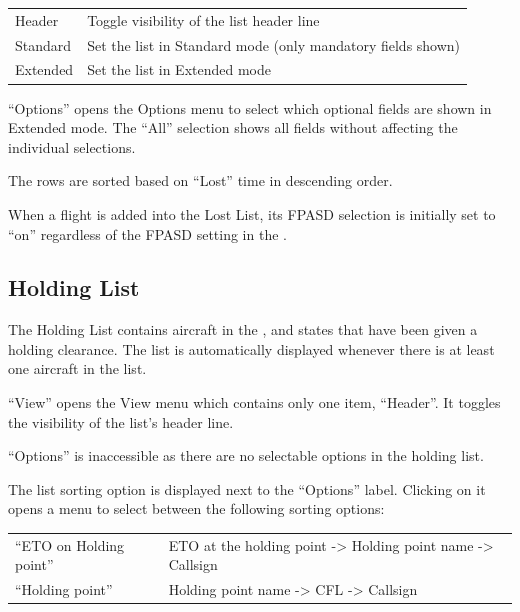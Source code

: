 \documentclass[a4paper,oneside,11pt]{memoir}
\begin{document}
\begin{longtable}{p{5cm} p{7.5cm}}
    Header      & Toggle visibility of the list header line                   \\
    Standard    & Set the list in Standard mode (only mandatory fields shown) \\
    Extended    & Set the list in Extended mode                               \\
\end{longtable}

\bigskip

“Options” opens the Options menu to select which optional fields are shown in Extended mode. The “All” selection shows all fields without affecting the individual selections.

\bigskip

The rows are sorted based on “Lost” time in descending order.

\bigskip

When a flight is added into the Lost List, its FPASD selection is initially set to “on” regardless of the FPASD setting in the .

\subsection{Holding List}
\label{list:hold}

The Holding List contains aircraft in the ,  and  states that have been given a holding clearance. The list is automatically displayed whenever there is at least one aircraft in the list.


“View” opens the View menu which contains only one item, “Header”. It toggles the visibility of the list’s header line.

\bigskip

“Options” is inaccessible as there are no selectable options in the holding list.

\bigskip

The list sorting option is displayed next to the “Options” label. Clicking on it opens a menu to select between the following sorting options:

\bigskip

\begin{longtable}{p{5cm} p{7.5cm}}
    “ETO on Holding point”  & ETO at the holding point -> Holding point name -> Callsign\\
    “Holding point”         & Holding point name -> CFL -> Callsign\\
\end{longtable}
\end{document}
